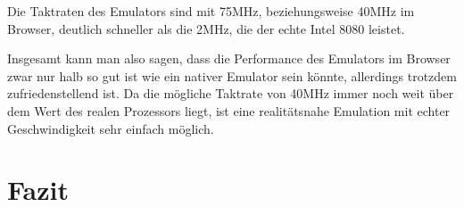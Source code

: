 Die Taktraten des Emulators sind mit 75MHz, beziehungsweise 40MHz im Browser, deutlich schneller als die 2MHz, die der echte Intel 8080 leistet.

Insgesamt kann man also sagen, dass die Performance des Emulators im Browser zwar nur halb so gut ist wie ein nativer Emulator sein könnte, allerdings trotzdem zufriedenstellend ist. Da die mögliche Taktrate von 40MHz immer noch weit über dem Wert des realen Prozessors liegt, ist eine realitätsnahe Emulation mit echter Geschwindigkeit sehr einfach möglich.

\section{Fazit}
